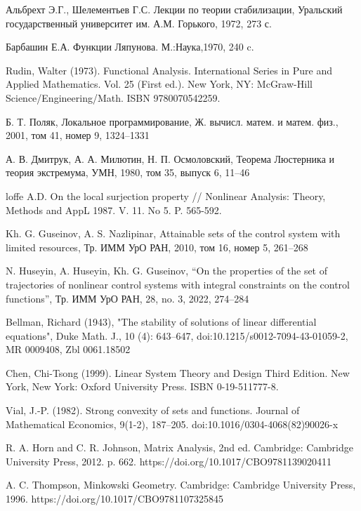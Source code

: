 \documentclass[../main.tex]{subfiles}
\begin{document}
\begin{thebibliography}{99}
 Альбрехт Э.Г., Шелементьев Г.С. Лекции по теории стабилизации, Уральский государственный университет им. А.М. Горького, 1972, 273 с.

Барбашин Е.А. Функции Ляпунова. М.:Наука,1970, 240 c.

Rudin, Walter (1973). Functional Analysis. International Series in Pure and Applied Mathematics. Vol. 25 (First ed.). New York, NY: McGraw-Hill Science/Engineering/Math. ISBN 9780070542259.

Б. Т. Поляк, Локальное программирование, Ж. вычисл. матем. и матем. физ., 2001, том 41, номер 9, 1324–1331

А. В. Дмитрук, А. А. Милютин, Н. П. Осмоловский, Теорема Люстерника и теория экстремума, УМН, 1980, том 35, выпуск 6, 11–46

loffe A.D. On the local surjection property // Nonlinear Analysis: Theory, Methods and AppL 1987. V. 11. No 5. P. 565-592.

Kh. G. Guseinov, A. S. Nazlipinar, Attainable sets of the control system with limited resources, Тр. ИММ УрО РАН, 2010, том 16, номер 5, 261–268

N. Huseyin, A. Huseyin, Kh. G. Guseinov, “On the properties of the set of trajectories of nonlinear control systems with integral constraints on the control functions”, Тр. ИММ УрО РАН, 28, no. 3, 2022, 274–284

 Bellman, Richard (1943), "The stability of solutions of linear differential equations", Duke Math. J., 10 (4): 643–647, doi:10.1215/s0012-7094-43-01059-2, MR 0009408, Zbl 0061.18502
 
Chen, Chi-Tsong (1999). Linear System Theory and Design Third Edition. New York, New York: Oxford University Press. ISBN 0-19-511777-8.

Vial, J.-P. (1982). Strong convexity of sets and functions. Journal of Mathematical Economics, 9(1-2), 187–205. doi:10.1016/0304-4068(82)90026-x

 R. A. Horn and C. R. Johnson, Matrix Analysis, 2nd ed. Cambridge: Cambridge University Press, 2012. p. 662. https://doi.org/10.1017/CBO9781139020411
 
 A. C. Thompson, Minkowski Geometry. Cambridge: Cambridge University Press, 1996. 
 https://doi.org/10.1017/CBO9781107325845
 

\end{thebibliography}
\end{document}
